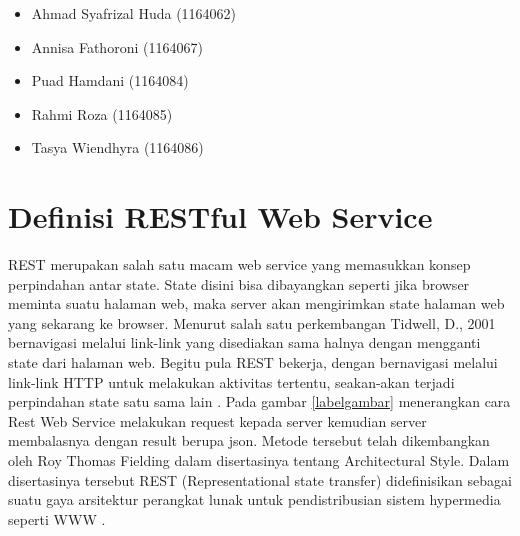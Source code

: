 \begin{itemize}
\item Ahmad Syafrizal Huda (1164062)
\item Annisa Fathoroni (1164067)
\item Puad Hamdani (1164084)
\item Rahmi Roza (1164085)
\item Tasya Wiendhyra (1164086)
\end{itemize}

\section{Definisi RESTful Web Service}
REST merupakan salah satu macam web service yang memasukkan konsep perpindahan antar state. State disini bisa dibayangkan seperti jika browser meminta suatu halaman web, maka server akan mengirimkan state halaman web yang sekarang ke browser. Menurut salah satu perkembangan Tidwell, D., 2001 bernavigasi melalui link-link yang disediakan sama halnya dengan mengganti state dari halaman web. Begitu pula REST bekerja, dengan bernavigasi melalui link-link HTTP untuk melakukan aktivitas tertentu, seakan-akan terjadi perpindahan state satu sama lain \cite{indrawan2017implementasi}.
Pada gambar \ref{labelgambar} menerangkan cara Rest Web Service melakukan request kepada server kemudian server membalasnya dengan result berupa json. Metode tersebut telah dikembangkan oleh Roy Thomas Fielding dalam disertasinya tentang Architectural Style.  Dalam disertasinya tersebut REST (Representational state transfer) didefinisikan sebagai suatu gaya arsitektur perangkat lunak untuk pendistribusian sistem hypermedia seperti WWW \cite{rofiq2017implementasi}.
